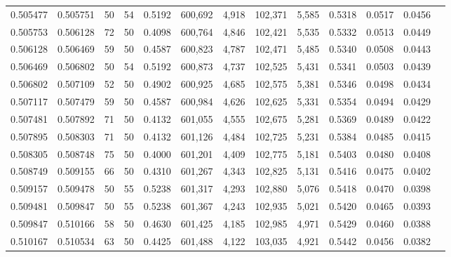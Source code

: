 \begin{tabular}{rrrrrrrrrrrrr}
0.505477 & 0.505751 &    50 &  54 &                                     0.5192 & 600,692 &   4,918 & 102,371 &   5,585 & 0.5318 & 0.0517 & 0.0456 \\
0.505753 & 0.506128 &    72 &  50 &                                     0.4098 & 600,764 &   4,846 & 102,421 &   5,535 & 0.5332 & 0.0513 & 0.0449 \\
0.506128 & 0.506469 &    59 &  50 &                                     0.4587 & 600,823 &   4,787 & 102,471 &   5,485 & 0.5340 & 0.0508 & 0.0443 \\
0.506469 & 0.506802 &    50 &  54 &                                     0.5192 & 600,873 &   4,737 & 102,525 &   5,431 & 0.5341 & 0.0503 & 0.0439 \\
0.506802 & 0.507109 &    52 &  50 &                                     0.4902 & 600,925 &   4,685 & 102,575 &   5,381 & 0.5346 & 0.0498 & 0.0434 \\
0.507117 & 0.507479 &    59 &  50 &                                     0.4587 & 600,984 &   4,626 & 102,625 &   5,331 & 0.5354 & 0.0494 & 0.0429 \\
0.507481 & 0.507892 &    71 &  50 &                                     0.4132 & 601,055 &   4,555 & 102,675 &   5,281 & 0.5369 & 0.0489 & 0.0422 \\
0.507895 & 0.508303 &    71 &  50 &                                     0.4132 & 601,126 &   4,484 & 102,725 &   5,231 & 0.5384 & 0.0485 & 0.0415 \\
0.508305 & 0.508748 &    75 &  50 &                                     0.4000 & 601,201 &   4,409 & 102,775 &   5,181 & 0.5403 & 0.0480 & 0.0408 \\
0.508749 & 0.509155 &    66 &  50 &                                     0.4310 & 601,267 &   4,343 & 102,825 &   5,131 & 0.5416 & 0.0475 & 0.0402 \\
0.509157 & 0.509478 &    50 &  55 &                                     0.5238 & 601,317 &   4,293 & 102,880 &   5,076 & 0.5418 & 0.0470 & 0.0398 \\
0.509481 & 0.509847 &    50 &  55 &                                     0.5238 & 601,367 &   4,243 & 102,935 &   5,021 & 0.5420 & 0.0465 & 0.0393 \\
0.509847 & 0.510166 &    58 &  50 &                                     0.4630 & 601,425 &   4,185 & 102,985 &   4,971 & 0.5429 & 0.0460 & 0.0388 \\
0.510167 & 0.510534 &    63 &  50 &                                     0.4425 & 601,488 &   4,122 & 103,035 &   4,921 & 0.5442 & 0.0456 & 0.0382 \\

\end{tabular}

